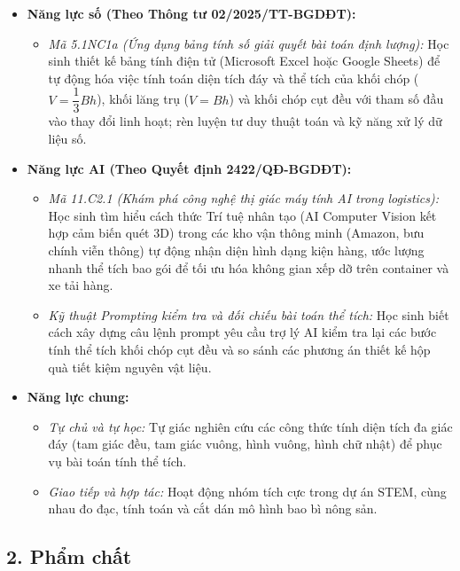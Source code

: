 \documentclass[12pt, a4paper]{article}
\begin{document}
\begin{itemize}[leftmargin=1.2cm]
    \item \textbf{Năng lực số (Theo Thông tư 02/2025/TT-BGDĐT):}
    \begin{itemize}[leftmargin=0.6cm]
        \item \textit{Mã 5.1NC1a (Ứng dụng bảng tính số giải quyết bài toán định lượng):} Học sinh thiết kế bảng tính điện tử (Microsoft Excel hoặc Google Sheets) để tự động hóa việc tính toán diện tích đáy và thể tích của khối chóp ($V = \dfrac{1}{3}Bh$), khối lăng trụ ($V = Bh$) và khối chóp cụt đều với tham số đầu vào thay đổi linh hoạt; rèn luyện tư duy thuật toán và kỹ năng xử lý dữ liệu số.
    \end{itemize}

    \item \textbf{Năng lực AI (Theo Quyết định 2422/QĐ-BGDĐT):}
    \begin{itemize}[leftmargin=0.6cm]
        \item \textit{Mã 11.C2.1 (Khám phá công nghệ thị giác máy tính AI trong logistics):} Học sinh tìm hiểu cách thức Trí tuệ nhân tạo (AI Computer Vision kết hợp cảm biến quét 3D) trong các kho vận thông minh (Amazon, bưu chính viễn thông) tự động nhận diện hình dạng kiện hàng, ước lượng nhanh thể tích bao gói để tối ưu hóa không gian xếp dỡ trên container và xe tải hàng.
        \item \textit{Kỹ thuật Prompting kiểm tra và đối chiếu bài toán thể tích:} Học sinh biết cách xây dựng câu lệnh prompt yêu cầu trợ lý AI kiểm tra lại các bước tính thể tích khối chóp cụt đều và so sánh các phương án thiết kế hộp quà tiết kiệm nguyên vật liệu.
    \end{itemize}

    \item \textbf{Năng lực chung:}
    \begin{itemize}[leftmargin=0.6cm]
        \item \textit{Tự chủ và tự học:} Tự giác nghiên cứu các công thức tính diện tích đa giác đáy (tam giác đều, tam giác vuông, hình vuông, hình chữ nhật) để phục vụ bài toán tính thể tích.
        \item \textit{Giao tiếp và hợp tác:} Hoạt động nhóm tích cực trong dự án STEM, cùng nhau đo đạc, tính toán và cắt dán mô hình bao bì nông sản.
    \end{itemize}
\end{itemize}

\subsection*{2. Phẩm chất}
\end{document}
